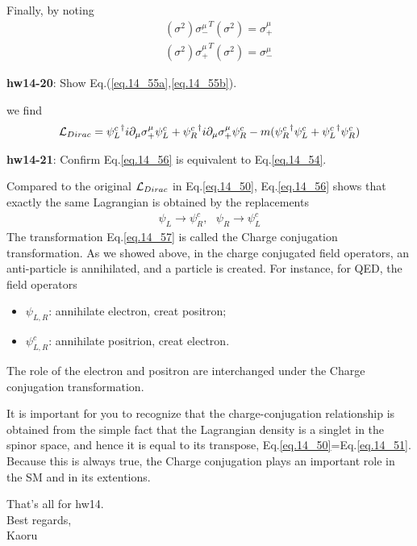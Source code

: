 \documentclass[12pt]{article}
\def\del{{\partial}}
\begin{document}
  Finally, by noting
\begin{eqnarray}
  &&(\sigma^2) {\sigma_-^\mu}^T (\sigma^2) = \sigma_+^\mu \label{eq.14_55a} \\
  && (\sigma^2) {\sigma_+^\mu}^T (\sigma^2) = \sigma_-^\mu \label{eq.14_55b}
\end{eqnarray}

{\bf hw14-20}: Show Eq.(\ref{eq.14_55a},\ref{eq.14_55b}).

we find
\begin{eqnarray}
  {\cal L}_{Dirac}= {\psi_L^c}^\dagger i\del_\mu {\sigma_+^\mu} {\psi_L^c}+{\psi_R^c}^\dagger i\del_\mu  {\sigma_+^\mu} {\psi_R^c} - m( {\psi_R^c}^\dagger{\psi_L^c} + {\psi_L^c}^\dagger {\psi_R^c})\label{eq.14_56}
\end{eqnarray}

{\bf hw14-21}: Confirm  Eq.\ref{eq.14_56} is equivalent to Eq.\ref{eq.14_54}.

  Compared to the original $ {\cal L}_{Dirac}$ in Eq.\ref{eq.14_50}, Eq.\ref{eq.14_56} shows that exactly
  the same Lagrangian is obtained by the replacements
\begin{eqnarray}
  \psi_L \to \psi_R^c, ~~~\psi_R \to \psi_L^c \label{eq.14_57}
\end{eqnarray}
  The transformation Eq.\ref{eq.14_57} is called the Charge conjugation transformation. As we showed above, in the charge conjugated field operators, an anti-particle is annihilated, and a particle is created.  For instance,
  for QED, the field operators
\begin{itemize}
  \item $\psi_{L,R}$: annihilate electron,  creat positron;
  \item $\psi_{L,R}^c$: annihilate positrion, creat electron.
\end{itemize}
  The role of the electron and positron are interchanged under the
  Charge conjugation transformation.

  It is important for you to recognize that the charge-conjugation
  relationship is obtained from the simple fact that the Lagrangian
  density is a singlet in the spinor space, and hence it is equal
  to its transpose, Eq.\ref{eq.14_50}=Eq.\ref{eq.14_51}. Because this is always true, the Charge conjugation plays an important role in the SM and in its extentions.

  That's all for hw14.\\

Best regards,\\

Kaoru
\end{document}
